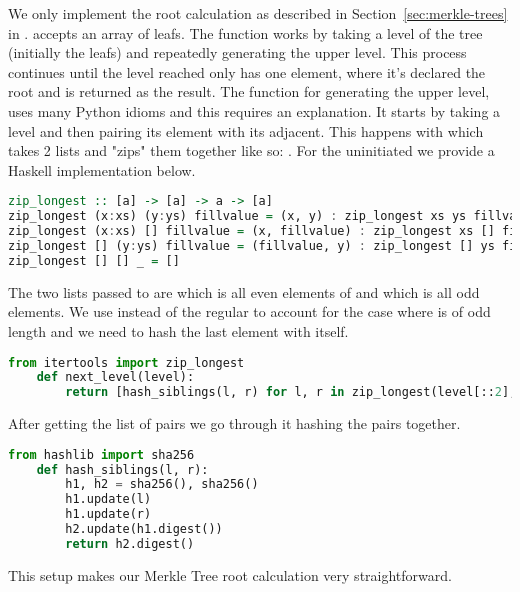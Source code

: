 We only implement the root calculation as described in Section~\ref{sec:merkle-trees} in .  accepts an array of leafs. The function works by taking a level of the tree (initially the leafs) and repeatedly generating the upper level. This process continues until the level reached only has one element, where it's declared the root and is returned as the result. The function for generating the upper level,  uses many Python idioms and this requires an explanation. It starts by taking a level and then pairing its element with its adjacent. This happens with  which takes 2 lists and "zips" them together like so: . For the uninitiated we provide a Haskell implementation below.

\begin{lstlisting}[language=Haskell]
zip_longest :: [a] -> [a] -> a -> [a]
zip_longest (x:xs) (y:ys) fillvalue = (x, y) : zip_longest xs ys fillvalue
zip_longest (x:xs) [] fillvalue = (x, fillvalue) : zip_longest xs [] fillvalue
zip_longest [] (y:ys) fillvalue = (fillvalue, y) : zip_longest [] ys fillvalue
zip_longest [] [] _ = []
\end{lstlisting}

The two lists passed to  are  which is all even elements of  and  which is all odd elements. We use  instead of the regular  to account for the case where  is of odd length and we need to hash the last element with itself.

\begin{lstlisting}[language=Python]
    from itertools import zip_longest
    def next_level(level):
        return [hash_siblings(l, r) for l, r in zip_longest(level[::2], level[1::2], fillvalue=level[-1])]
\end{lstlisting}

After getting the list of pairs we go through it hashing the pairs together.

\begin{lstlisting}[language=Python]
    from hashlib import sha256
    def hash_siblings(l, r):
        h1, h2 = sha256(), sha256()
        h1.update(l)
        h1.update(r)
        h2.update(h1.digest())
        return h2.digest()
\end{lstlisting}

This setup makes our Merkle Tree root calculation very straightforward.

